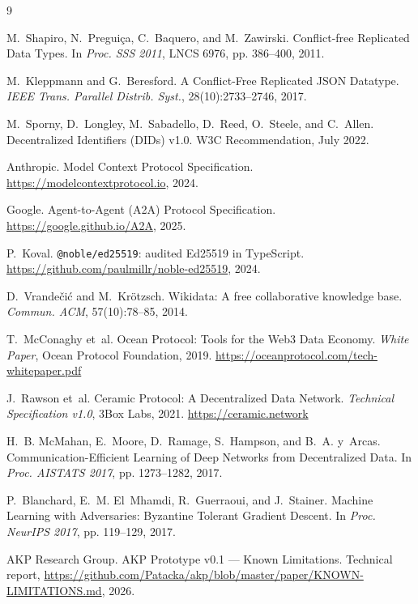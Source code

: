 \documentclass[10pt,twocolumn]{article}
\begin{document}
\begin{thebibliography}{9}

M.~Shapiro, N.~Preguiça, C.~Baquero, and M.~Zawirski.
\newblock Conflict-free Replicated Data Types.
\newblock In \textit{Proc. SSS 2011}, LNCS 6976, pp. 386--400, 2011.

M.~Kleppmann and G.~Beresford.
\newblock A Conflict-Free Replicated JSON Datatype.
\newblock \textit{IEEE Trans. Parallel Distrib. Syst.}, 28(10):2733--2746, 2017.

M.~Sporny, D.~Longley, M.~Sabadello, D.~Reed, O.~Steele, and C.~Allen.
\newblock Decentralized Identifiers (DIDs) v1.0.
\newblock W3C Recommendation, July 2022.

Anthropic.
\newblock Model Context Protocol Specification.
\newblock \url{https://modelcontextprotocol.io}, 2024.

Google.
\newblock Agent-to-Agent (A2A) Protocol Specification.
\newblock \url{https://google.github.io/A2A}, 2025.

P.~Koval.
\newblock \texttt{@noble/ed25519}: audited Ed25519 in TypeScript.
\newblock \url{https://github.com/paulmillr/noble-ed25519}, 2024.

D.~Vrandečić and M.~Krötzsch.
\newblock Wikidata: A free collaborative knowledge base.
\newblock \textit{Commun. ACM}, 57(10):78--85, 2014.

T.~McConaghy et~al.
\newblock Ocean Protocol: Tools for the Web3 Data Economy.
\newblock \textit{White Paper}, Ocean Protocol Foundation, 2019.
\newblock \url{https://oceanprotocol.com/tech-whitepaper.pdf}

J.~Rawson et~al.
\newblock Ceramic Protocol: A Decentralized Data Network.
\newblock \textit{Technical Specification v1.0}, 3Box Labs, 2021.
\newblock \url{https://ceramic.network}

H.~B. McMahan, E.~Moore, D.~Ramage, S.~Hampson, and B.~A. y~Arcas.
\newblock Communication-Efficient Learning of Deep Networks from
Decentralized Data.
\newblock In \textit{Proc. AISTATS 2017}, pp. 1273--1282, 2017.

P.~Blanchard, E.~M. El~Mhamdi, R.~Guerraoui, and J.~Stainer.
\newblock Machine Learning with Adversaries: Byzantine Tolerant Gradient
Descent.
\newblock In \textit{Proc. NeurIPS 2017}, pp. 119--129, 2017.

AKP Research Group.
\newblock AKP Prototype v0.1 — Known Limitations.
\newblock Technical report, \url{https://github.com/Patacka/akp/blob/master/paper/KNOWN-LIMITATIONS.md}, 2026.

\end{thebibliography}
\end{document}
